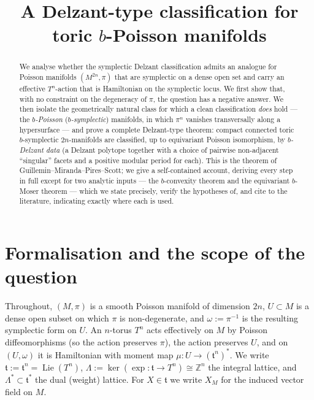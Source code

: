 \documentclass{amsart}
\theoremstyle{definition}
\begin{document}
\title{A Delzant-type classification for toric $b$-Poisson manifolds}
\maketitle

\begin{abstract}
We analyse whether the symplectic Delzant classification admits an analogue for
Poisson manifolds $(M^{2n},\pi)$ that are symplectic on a dense open set and
carry an effective $T^n$-action that is Hamiltonian on the symplectic locus. We
first show that, with no constraint on the degeneracy of $\pi$, the question has
a negative answer. We then isolate the geometrically natural class for which a
clean classification \emph{does} hold --- the \emph{$b$-Poisson}
(\emph{$b$-symplectic}) manifolds, in which $\pi^n$ vanishes transversally along
a hypersurface --- and prove a complete Delzant-type theorem: compact connected
toric $b$-symplectic $2n$-manifolds are classified, up to equivariant Poisson
isomorphism, by \emph{$b$-Delzant data} (a Delzant polytope together with a
choice of pairwise non-adjacent ``singular'' facets and a positive modular
period for each). This is the theorem of Guillemin--Miranda--Pires--Scott; we
give a self-contained account, deriving every step in full except for two
analytic inputs --- the $b$-convexity theorem and the equivariant $b$-Moser
theorem --- which we state precisely, verify the hypotheses of, and cite to the
literature, indicating exactly where each is used.
\end{abstract}

\section{Formalisation and the scope of the question}

Throughout, $(M,\pi)$ is a smooth Poisson manifold of dimension $2n$,
$U\subset M$ is a dense open subset on which $\pi$ is non-degenerate, and
$\omega:=\pi^{-1}$ is the resulting symplectic form on $U$. An $n$-torus $T^n$
acts effectively on $M$ by Poisson diffeomorphisms (so the action preserves
$\pi$), the action preserves $U$, and on $(U,\omega)$ it is Hamiltonian with
moment map $\mu\colon U\to(\mathfrak t^n)^*$. We write
$\mathfrak t:=\mathfrak t^n=\operatorname{Lie}(T^n)$,
$\Lambda:=\ker(\exp\colon\mathfrak t\to T^n)\cong\mathbb Z^n$ the integral
lattice, and $\Lambda^*\subset\mathfrak t^*$ the dual (weight) lattice. For
$X\in\mathfrak t$ we write $X_M$ for the induced vector field on $M$.
\end{document}
